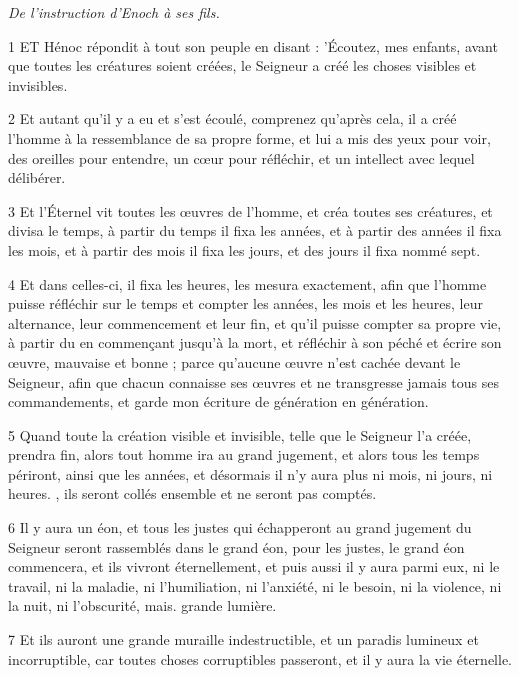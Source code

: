 
\par \textit{De l'instruction d'Enoch à ses fils.}

\par 1 ET Hénoc répondit à tout son peuple en disant : 'Écoutez, mes enfants, avant que toutes les créatures soient créées, le Seigneur a créé les choses visibles et invisibles.

\par 2 Et autant qu'il y a eu et s'est écoulé, comprenez qu'après cela, il a créé l'homme à la ressemblance de sa propre forme, et lui a mis des yeux pour voir, des oreilles pour entendre, un cœur pour réfléchir, et un intellect avec lequel délibérer.

\par 3 Et l'Éternel vit toutes les œuvres de l'homme, et créa toutes ses créatures, et divisa le temps, à partir du temps il fixa les années, et à partir des années il fixa les mois, et à partir des mois il fixa les jours, et des jours il fixa nommé sept.

\par 4 Et dans celles-ci, il fixa les heures, les mesura exactement, afin que l'homme puisse réfléchir sur le temps et compter les années, les mois et les heures, leur alternance, leur commencement et leur fin, et qu'il puisse compter sa propre vie, à partir du en commençant jusqu'à la mort, et réfléchir à son péché et écrire son œuvre, mauvaise et bonne ; parce qu'aucune œuvre n'est cachée devant le Seigneur, afin que chacun connaisse ses œuvres et ne transgresse jamais tous ses commandements, et garde mon écriture de génération en génération.

\par 5 Quand toute la création visible et invisible, telle que le Seigneur l'a créée, prendra fin, alors tout homme ira au grand jugement, et alors tous les temps périront, ainsi que les années, et désormais il n'y aura plus ni mois, ni jours, ni heures. , ils seront collés ensemble et ne seront pas comptés.

\par 6 Il y aura un éon, et tous les justes qui échapperont au grand jugement du Seigneur seront rassemblés dans le grand éon, pour les justes, le grand éon ​​commencera, et ils vivront éternellement, et puis aussi il y aura parmi eux, ni le travail, ni la maladie, ni l'humiliation, ni l'anxiété, ni le besoin, ni la violence, ni la nuit, ni l'obscurité, mais. grande lumière.

\par 7 Et ils auront une grande muraille indestructible, et un paradis lumineux et incorruptible, car toutes choses corruptibles passeront, et il y aura la vie éternelle.

